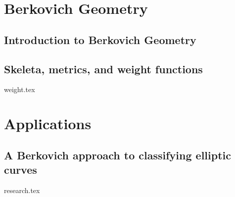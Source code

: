 \part{Berkovich Geometry}
\chapter{Introduction to Berkovich Geometry} \label{chap:intro_berkovich}


\chapter{Skeleta, metrics, and weight functions} \label{chap:weight_functions}
{weight.tex}

\part{Applications}
\chapter{A Berkovich approach to classifying elliptic curves} \label{chap:a_berkovich_approach_to_classifying_elliptic_curves}
{research.tex}


\pagebreak
\printbibliography


